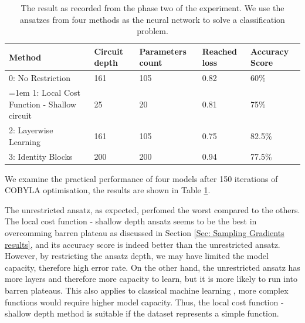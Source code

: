 \begin{table}
    \centering
    \begin{tabular}{|| p{4cm} p{2cm} p{2cm} p{2cm} p{2cm} ||}
        \hline
        \textbf{Method}                          & \textbf{Circuit depth} & \textbf{Parameters count} & \textbf{Reached loss} & \textbf{Accuracy Score} \\
        \hline \hline
        0: No Restriction                        & 161                    & 105                       & 0.82                  & 60\%                    \\
        \raggedright
        \hangindent=1em
        \hangafter=1
        1: Local Cost Function - Shallow circuit & 25                     & 20                        & 0.81                  & 75\%                    \\
        2: Layerwise Learning                    & 161                    & 105                       & 0.75                  & 82.5\%                  \\
        3: Identity Blocks                       & 200                    & 200                       & 0.94                  & 77.5\%                  \\
        \hline
    \end{tabular}
    \caption{
        The result as recorded from the phase two of the experiment.
        We use the ansatzes from four methods as the neural network to solve a classification problem.
    }
    \label{Tab: Experiment Phase 2 Res}
\end{table}

We examine the practical performance of four models after 150 iterations of COBYLA optimisation, the results are shown in Table \ref{Tab: Experiment Phase 2 Res}.

The unrestricted ansatz, as expected, perfomed the worst compared to the others.
The local cost function - shallow depth ansatz seems to be the best in overcomming barren plateau as discussed in Section \ref{Sec: Sampling Gradients results}, and its accuracy score is indeed better than the unrestricted ansatz.
However, by restricting the ansatz depth, we may have limited the model capacity, therefore high error rate.
On the other hand, the unrestricted ansatz has more layers and therefore more capacity to learn, but it is more likely to run into barren plateaus.
This also applies to classical machine learning \cite{ianDeepLearningAdaptive2016}, more complex functions would require higher model capacity.
Thus, the local cost function - shallow depth method is suitable if the dataset represents a simple function.

